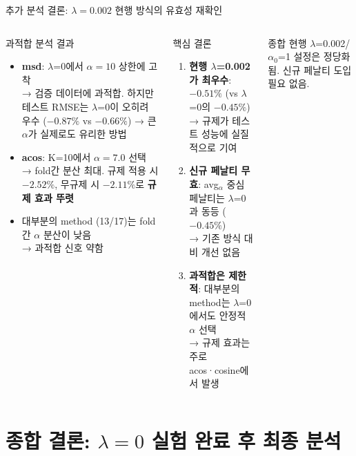 \documentclass[aspectratio=169,10pt]{beamer}
\begin{document}
\begin{frame}[shrink=10]{추가 분석 결론: $\lambda=0.002$ 현행 방식의 유효성 재확인}
	\begin{columns}[T]
			\begin{block}{과적합 분석 결과}
				\begin{itemize}
					\item \textbf{msd}: $\lambda$=0에서 $\alpha=10$ 상한에 고착 \\ \small → 검증 데이터에 과적합. 하지만 테스트 RMSE는 $\lambda$=0이 오히려 우수 ($-0.87\%$ vs $-0.66\%$) → 큰 $\alpha$가 실제로도 유리한 방법
					\item \textbf{acos}: K=10에서 $\alpha=7.0$ 선택 → fold간 분산 최대. 규제 적용 시 $-2.52\%$, 무규제 시 $-2.11\%$로 \textbf{규제 효과 뚜렷}
					\item 대부분의 method (13/17)는 fold간 $\alpha$ 분산이 낮음 \\ \small → 과적합 신호 약함
				\end{itemize}
			\end{block}

			\begin{alertblock}{핵심 결론}
				\begin{enumerate}
					\item \textbf{현행 $\lambda$=0.002가 최우수}: $-0.51\%$ (vs $\lambda$=0의 $-0.45\%$) \\ \small → 규제가 테스트 성능에 실질적으로 기여
					\item \textbf{신규 페날티 무효}: avg$_\alpha$ 중심 페날티는 $\lambda$=0과 동등 ($-0.45\%$) \\ \small → 기존 방식 대비 개선 없음
					\item \textbf{과적합은 제한적}: 대부분의 method는 $\lambda$=0에서도 안정적 $\alpha$ 선택 \\ \small → 규제 효과는 주로 acos·cosine에서 발생
				\end{enumerate}
			\end{alertblock}
			\begin{block}{종합}
				현행 $\lambda$=0.002/$\alpha_0$=1 설정은 정당화됨. 신규 페날티 도입 필요 없음.
			\end{block}
	\end{columns}
\end{frame}

\section{종합 결론: $\lambda=0$ 실험 완료 후 최종 분석}
\end{document}
